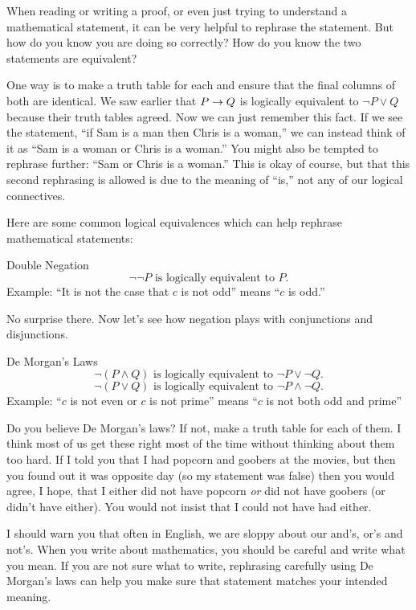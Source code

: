 \documentclass[12pt]{article}
\begin{document}
When reading or writing a proof, or even just trying to understand a mathematical statement, it can be very helpful to rephrase the statement.  But how do you know you are doing so correctly?  How do you know the two statements are equivalent?

One way is to make a truth table for each and ensure that the final columns of both are identical.
We saw earlier that $P \rightarrow Q$ is logically equivalent to $\neg P \vee Q$ because their truth tables agreed.  Now we can just remember this fact.  If we see the statement, ``if Sam is a man then Chris is a woman,'' we can instead think of it as ``Sam is a woman or Chris is a woman.''  You might also be tempted to rephrase further: ``Sam or Chris is a woman.''  This is okay of course, but that this second rephrasing is allowed is due to the meaning of ``is,'' not any of our logical connectives.

Here are some common logical equivalences which can help rephrase mathematical statements:

\begin{defbox}{Double Negation}
  \[\neg \neg P \mbox{ is logically equivalent to } P.\]
  Example: ``It is not the case that $c$ is not odd'' means ``$c$ is odd.''
\end{defbox}

No surprise there.  Now let's see how negation plays with conjunctions and disjunctions.

\begin{defbox}{De Morgan's Laws}
  \[\neg(P \wedge Q) \mbox{ is logically equivalent to } \neg P \vee \neg Q.\]
  \[\neg(P \vee Q) \mbox{ is logically equivalent to } \neg P \wedge \neg Q.\]
  Example: ``$c$ is not even or $c$ is not prime'' means ``$c$ is not both odd and prime''
\end{defbox}

Do you believe De Morgan's laws?  If not, make a truth table for each of them.  I think most of us get these right most of the time without thinking about them too hard.  If I told you that I had popcorn and goobers at the movies, but then you found out it was opposite day (so my statement was false) then you would agree, I hope, that I either did not have popcorn {\em or} did not have goobers (or didn't have either).  You would not insist that I could not have had either.

I should warn you that often in English, we are sloppy about our and's, or's and not's.  When you write about mathematics, you should be careful and write what you mean.  If you are not sure what to write, rephrasing carefully using De Morgan's laws can help you make sure that statement matches your intended meaning.
\end{document}
